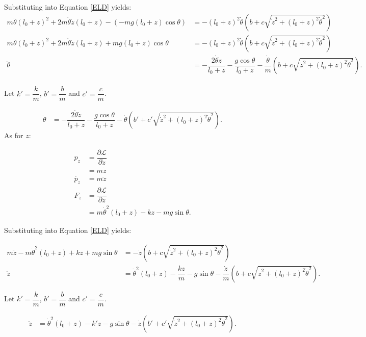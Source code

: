 \documentclass[12pt,a4paper,portrait]{article}
\begin{document}
Substituting into Equation \eqref{ELD} yields:
\begin{align*}
	m\ddot{\theta} (l_0+z)^2 + 2m\dot{\theta}\dot{z}(l_0+z) - (-mg(l_0+z)\cos{\theta}) &= -(l_0+z)^2 \dot{\theta} \left(b+c\sqrt{\dot{z}^2+(l_0+z)^2\dot{\theta}^2}\right) \\
	m\ddot{\theta} (l_0+z)^2 + 2m\dot{\theta}\dot{z}(l_0+z) +mg(l_0+z)\cos{\theta} &= -(l_0+z)^2 \dot{\theta} \left(b+c\sqrt{\dot{z}^2+(l_0+z)^2\dot{\theta}^2}\right) \\
	\ddot{\theta} &= -\dfrac{2\dot{\theta}\dot{z}}{l_0+z} - \dfrac{g\cos{\theta}}{l_0+z} -\dfrac{\dot{\theta}}{m} \left(b+c\sqrt{\dot{z}^2+(l_0+z)^2\dot{\theta}^2}\right). \\
\end{align*}

Let $k'=\dfrac{k}{m}$, $b'=\dfrac{b}{m}$ and $c'=\dfrac{c}{m}$.

\begin{align*}
	\ddot{\theta} &= -\dfrac{2\dot{\theta}\dot{z}}{l_0+z} - \dfrac{g\cos{\theta}}{l_0+z} -\dot{\theta} \left(b'+c'\sqrt{\dot{z}^2+(l_0+z)^2\dot{\theta}^2}\right).
\end{align*}
As for $z$:

\begin{align*}
	p_z &= \dfrac{\partial \mathcal{L}}{\partial \dot{z}} \\
	&= m\dot{z} \\
	\dot{p_z} &= m\ddot{z} \\
	F_z &= \dfrac{\partial \mathcal{L}}{\partial z} \\
	&= m\dot{\theta}^2(l_0+z) - kz - mg\sin{\theta}.
\end{align*}

Substituting into Equation \eqref{ELD} yields:

\begin{align*}
	m\ddot{z} - m\dot{\theta}^2(l_0+z) + kz + mg\sin{\theta} &= -\dot{z}\left(b+c\sqrt{\dot{z}^2+(l_0+z)^2\dot{\theta}^2}\right) \\
	\ddot{z} &= \dot{\theta}^2(l_0+z) - \dfrac{kz}{m} - g\sin{\theta} -\dfrac{\dot{z}}{m}\left(b+c\sqrt{\dot{z}^2+(l_0+z)^2\dot{\theta}^2}\right).
\end{align*}

Let $k'=\dfrac{k}{m}$, $b'=\dfrac{b}{m}$ and $c'=\dfrac{c}{m}$.

\begin{align*}
	\ddot{z} &= \dot{\theta}^2(l_0+z) - k'z - g\sin{\theta} -\dot{z}\left(b'+c'\sqrt{\dot{z}^2+(l_0+z)^2\dot{\theta}^2}\right).
\end{align*}
	
\end{document}
